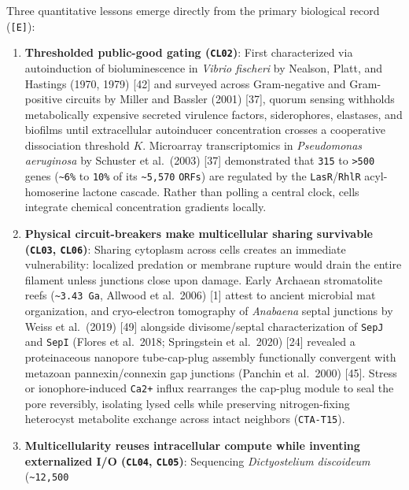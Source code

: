 \documentclass[10pt,letterpaper]{article}
\providecommand{\tightlist}{\setlength{\itemsep}{1pt}\setlength{\parskip}{0pt}}
\begin{document}
Three quantitative lessons emerge directly from the primary biological
record (\texttt{{[}E{]}}):

\begin{enumerate}
\def\labelenumi{\arabic{enumi}.}
\tightlist
\item
  \textbf{Thresholded public-good gating (\texttt{CL02})}: First
  characterized via autoinduction of bioluminescence in \emph{Vibrio
  fischeri} by Nealson, Platt, and Hastings (1970, 1979) {[}42{]} and
  surveyed across Gram-negative and Gram-positive circuits by Miller and
  Bassler (2001) {[}37{]}, quorum sensing withholds metabolically
  expensive secreted virulence factors, siderophores, elastases, and
  biofilms until extracellular autoinducer concentration crosses a
  cooperative dissociation threshold \(K\). Microarray transcriptomics
  in \emph{Pseudomonas aeruginosa} by Schuster et al.~(2003) {[}37{]}
  demonstrated that \texttt{315} to \texttt{\textgreater{}500} genes
  (\texttt{\textasciitilde{}6\%} to \texttt{10\%} of its
  \texttt{\textasciitilde{}5,570} \texttt{ORFs}) are regulated by the
  \texttt{LasR}/\allowbreak{}\texttt{RhlR} acyl-homoserine lactone cascade. Rather
  than polling a central clock, cells integrate chemical concentration
  gradients locally.
\item
  \textbf{Physical circuit-breakers make multicellular sharing
  survivable (\texttt{CL03}, \texttt{CL06})}: Sharing cytoplasm across
  cells creates an immediate vulnerability: localized predation or
  membrane rupture would drain the entire filament unless junctions
  close upon damage. Early Archaean stromatolite reefs
  (\texttt{\textasciitilde{}3.43\ Ga}, Allwood et al.~2006) {[}1{]}
  attest to ancient microbial mat organization, and cryo-electron
  tomography of \emph{Anabaena} septal junctions by Weiss et al.~(2019)
  {[}49{]} alongside divisome/septal characterization of \texttt{SepJ}
  and \texttt{SepI} (Flores et al.~2018; Springstein et al.~2020)
  {[}24{]} revealed a proteinaceous nanopore tube-cap-plug assembly
  functionally convergent with metazoan pannexin/connexin gap junctions
  (Panchin et al.~2000) {[}45{]}. Stress or ionophore-induced
  \texttt{Ca2+} influx rearranges the cap-plug module to seal the pore
  reversibly, isolating lysed cells while preserving nitrogen-fixing
  heterocyst metabolite exchange across intact neighbors
  (\texttt{CTA-T15}).
\item
  \textbf{Multicellularity reuses intracellular compute while inventing
  externalized I/O (\texttt{CL04}, \texttt{CL05})}: Sequencing
  \emph{Dictyostelium discoideum} (\texttt{\textasciitilde{}12,500}

\end{enumerate}
\end{document}

